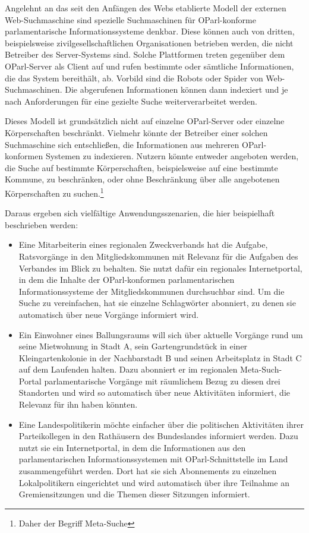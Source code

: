 \documentclass[,a4paper]{article}
\begin{document}
Angelehnt an das seit den Anfängen des Webs etablierte Modell der
externen Web-Suchmaschine sind spezielle Suchmaschinen für
OParl-konforme parlamentarische Informationssysteme denkbar. Diese
können auch von dritten, beispielsweise zivilgesellschaftlichen
Organisationen betrieben werden, die nicht Betreiber des Server-Systems
sind. Solche Plattformen treten gegenüber dem OParl-Server als Client
auf und rufen bestimmte oder sämtliche Informationen, die das System
bereithält, ab. Vorbild sind die Robots oder Spider von
Web-Suchmaschinen. Die abgerufenen Informationen können dann indexiert
und je nach Anforderungen für eine gezielte Suche weiterverarbeitet
werden.

Dieses Modell ist grundsätzlich nicht auf einzelne OParl-Server oder
einzelne Körperschaften beschränkt. Vielmehr könnte der Betreiber einer
solchen Suchmaschine sich entschließen, die Informationen aus mehreren
OParl-konformen Systemen zu indexieren. Nutzern könnte entweder
angeboten werden, die Suche auf bestimmte Körperschaften, beispielsweise
auf eine bestimmte Kommune, zu beschränken, oder ohne Beschränkung über
alle angebotenen Körperschaften zu suchen.\footnote{Daher der Begriff
  Meta-Suche}

Daraus ergeben sich vielfältige Anwendungsszenarien, die hier
beispielhaft beschrieben werden:

\begin{itemize}
\item
  Eine Mitarbeiterin eines regionalen Zweckverbands hat die Aufgabe,
  Ratsvorgänge in den Mitgliedskommunen mit Relevanz für die Aufgaben
  des Verbandes im Blick zu behalten. Sie nutzt dafür ein regionales
  Internetportal, in dem die Inhalte der OParl-konformen
  parlamentarischen Informationssysteme der Mitgliedskommunen
  durchsuchbar sind. Um die Suche zu vereinfachen, hat sie einzelne
  Schlagwörter abonniert, zu denen sie automatisch über neue Vorgänge
  informiert wird.
\item
  Ein Einwohner eines Ballungsraums will sich über aktuelle Vorgänge
  rund um seine Mietwohnung in Stadt A, sein Gartengrundstück in einer
  Kleingartenkolonie in der Nachbarstadt B und seinen Arbeitsplatz in
  Stadt C auf dem Laufenden halten. Dazu abonniert er im regionalen
  Meta-Such-Portal parlamentarische Vorgänge mit räumlichem Bezug zu
  diesen drei Standorten und wird so automatisch über neue Aktivitäten
  informiert, die Relevanz für ihn haben könnten.
\item
  Eine Landespolitikerin möchte einfacher über die politischen
  Aktivitäten ihrer Parteikollegen in den Rathäusern des Bundeslandes
  informiert werden. Dazu nutzt sie ein Internetportal, in dem die
  Informationen aus den parlamentarischen Informationssystemen mit
  OParl-Schnittstelle im Land zusammengeführt werden. Dort hat sie sich
  Abonnements zu einzelnen Lokalpolitikern eingerichtet und wird
  automatisch über ihre Teilnahme an Gremiensitzungen und die Themen
  dieser Sitzungen informiert.
\end{itemize}
\end{document}
